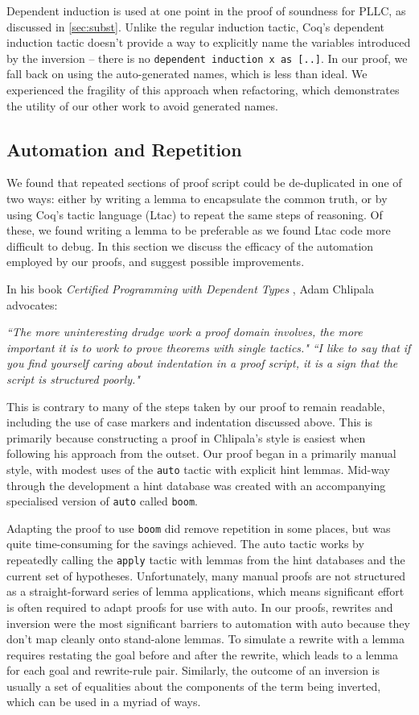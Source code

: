 \documentclass[]{unswthesis}
\let\c\texttt
\let\i\textit
\begin{document}
Dependent induction is used at one point in the proof of soundness for PLLC, as discussed in \cref{sec:subst}. Unlike the regular induction tactic, Coq's dependent induction tactic doesn't provide a way to explicitly name the variables introduced by the inversion -- there is no \c{dependent induction x as [..]}. In our proof, we fall back on using the auto-generated names, which is less than ideal. We experienced the fragility of this approach when refactoring, which demonstrates the utility of our other work to avoid generated names.

\subsection{Automation and Repetition}
\label{sec:automation}

We found that repeated sections of proof script could be de-duplicated in one of two ways: either by writing a lemma to encapsulate the common truth, or by using Coq's tactic language (Ltac) to repeat the same steps of reasoning. Of these, we found writing a lemma to be preferable as we found Ltac code more difficult to debug. In this section we discuss the efficacy of the automation employed by our proofs, and suggest possible improvements.

In his book \i{Certified Programming with Dependent Types} \cite{cpdt}, Adam Chlipala advocates:

\i{``The more uninteresting drudge work a proof domain involves, the more important it is to work to prove theorems with single tactics."}
\i{``I like to say that if you find yourself caring about indentation in a proof script, it is a sign that the script is structured poorly."}

This is contrary to many of the steps taken by our proof to remain readable, including the use of case markers and indentation discussed above. This is primarily because constructing a proof in Chlipala's style is easiest when following his approach from the outset. Our proof began in a primarily manual style, with modest uses of the \c{auto} tactic with explicit hint lemmas. Mid-way through the development a hint database was created with an accompanying specialised version of \c{auto} called \c{boom}.

Adapting the proof to use \c{boom} did remove repetition in some places, but was quite time-consuming for the savings achieved. The auto tactic works by repeatedly calling the \c{apply} tactic with lemmas from the hint databases and the current set of hypotheses. Unfortunately, many manual proofs are not structured as a straight-forward series of lemma applications, which means significant effort is often required to adapt proofs for use with auto. In our proofs, rewrites and inversion were the most significant barriers to automation with auto because they don't map cleanly onto stand-alone lemmas. To simulate a rewrite with a lemma requires restating the goal before and after the rewrite, which leads to a lemma for each goal and rewrite-rule pair. Similarly, the outcome of an inversion is usually a set of equalities about the components of the term being inverted, which can be used in a myriad of ways.
\end{document}
